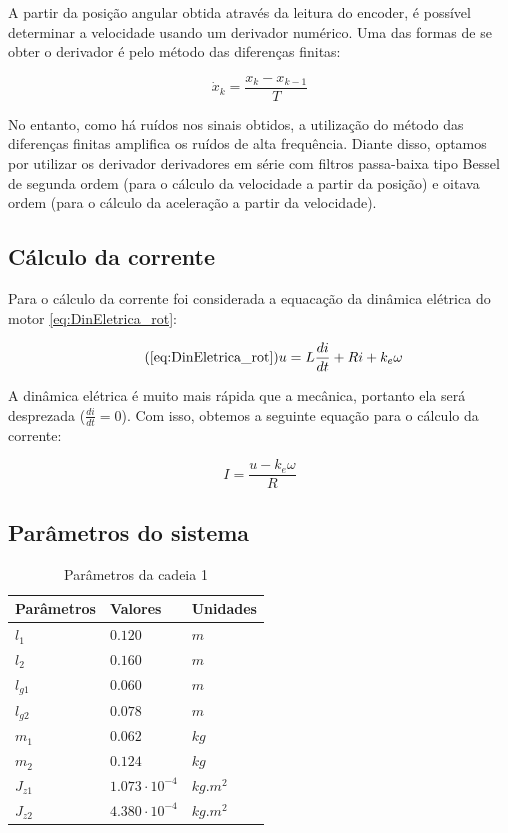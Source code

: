 \documentclass[]{politex}
\begin{document}
A partir da posição angular obtida através da leitura do encoder, é possível determinar a velocidade usando um derivador numérico. Uma das formas de se obter o derivador é pelo método das diferenças finitas:

\begin{equation}
\dot{x}_k = \frac{x_k - x_{k-1}}{T}
\end{equation}

No entanto, como há ruídos nos sinais obtidos, a utilização  do método das diferenças finitas amplifica os ruídos de alta frequência. Diante disso, optamos por utilizar os derivador derivadores em série com filtros passa-baixa tipo Bessel de segunda ordem (para o cálculo da velocidade a partir da posição) e oitava ordem (para o cálculo da aceleração a partir da velocidade).

\subsection{Cálculo da corrente}

Para o cálculo da corrente foi considerada a equacação da dinâmica elétrica do motor \eqref{eq:DinEletrica_rot}:

\begin{equation}
\tag{\ref{eq:DinEletrica_rot}}
	   u = L \frac{di}{dt} + R i + k_{e} \omega
\end{equation}

A dinâmica elétrica é muito mais rápida que a mecânica, portanto ela será desprezada ($\frac{di}{dt} = 0$). Com isso, obtemos a seguinte equação para o cálculo da corrente:

\begin{equation}
\label{corrente}
I = \frac{u - k_e \omega}{R}
\end{equation}

\subsection{Parâmetros do sistema}

\begin{table}[H] 
\centering
\caption{Parâmetros da cadeia 1}
\label{parametrosCadeia1}
\begin{tabular}{l|l|l}
Parâmetros   & Valores                  & Unidades   \\ \hline
$l_1$        & $0.120$                     & $m$        \\
$l_2$        & $0.160$                     & $m$        \\
$l_{g1}$     & $0.060$                     & $m$        \\
$l_{g2}$     & $0.078$                    & $m$        \\
$m_1$        & $0.062$                    & $kg$       \\
$m_2$        & $0.124$                    & $kg$       \\
$J_{z1}$     & $1.073 \cdot 10^{-4}$    & $kg.m^{2}$ \\
$J_{z2}$     & $4.380 \cdot 10^{-4}$    & $kg.m^{2}$ \\
\end{tabular}
\end{table} 
\end{document}
